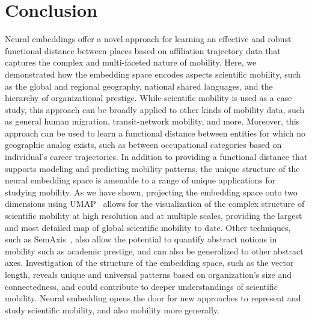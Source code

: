 \documentclass[12pt]{article} %
\begin{document}
%
%
\section*{Conclusion}

Neural embeddings offer a novel approach for learning an effective and robust functional distance between places based on affiliation trajectory data that captures the complex and multi-faceted nature of mobility. 
Here, we demonstrated how the embedding space encodes aspects scientific mobility, such as the  global and regional geography, national shared languages, and the hierarchy of organizational prestige. 
While scientific mobility is used as a case study, this approach can be broadly applied to other kinds of mobility data, such as general human migration, transit-network mobility, and more.
Moreover, this approach can be used to learn a functional distance between entities for which no geographic analog exists, such as between occupational categories based on individual's career trajectories. 
In addition to providing a functional distance that supports modeling and predicting mobility patterns, the unique structure of the neural embedding space is amenable to a range of unique applications for studying mobility. 
As we have shown, projecting the embedding space onto two dimensions using UMAP~\autocite{mcinnes2018umap} allows for the visualization of the complex structure of scientific mobility at high resolution and at multiple scales, providing the largest and most detailed map of global scientific mobility to date. 
Other techniques, such as SemAxis~\autocite{an2018semaxis}, also allow the potential to quantify abstract notions in mobility such as academic prestige, and can also be generalized to other abstract axes.
Investigation of the structure of the embedding space, such as the vector length, reveals unique and universal patterns based on organization's size and connectedness, and could contribute to deeper understandings of scientific mobility. 
Neural embedding opens the door for new approaches to represent and study scientific mobility, and also mobility more generally. 
\end{document}
